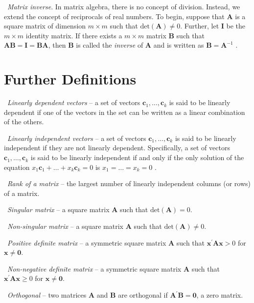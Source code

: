 \textbullet\ \emph{Matrix inverse}. In matrix algebra, there is no
concept of division. Instead, we extend the concept of reciprocals
of real numbers. To begin, suppose that $\mathbf{A}$ is a square
matrix of dimension $m\times m$ such that
$\mathrm{det}(\mathbf{A})\neq 0$. Further, let $\mathbf{I}$ be the
$m\times m$ identity matrix. If there exists a $m\times m$ matrix $
\mathbf{B}$ such that $\mathbf{AB=I=BA}$, then $\mathbf{B}$ is
called the \emph{inverse} of $\mathbf{A}$ and is written as
$\mathbf{B}=\mathbf{A}^{-1}$ .

\section{Further Definitions}

\quad \quad \textbullet\ \emph{Linearly dependent vectors} -- a set of
vectors $\mathbf{c}_{1},\ldots ,\mathbf{c}_{k}$ is said to be linearly
dependent if one of the vectors in the set can be written as a linear
combination of the others.

\textbullet\ \emph{Linearly independent vectors} -- a set of vectors
$ \mathbf{c}_{1},\ldots ,\mathbf{c}_{k}$ is said to be linearly
independent if they are not linearly dependent. Specifically, a set
of vectors $\mathbf{c} _{1},\ldots ,\mathbf{c}_{k}$ is said to be
linearly independent if and only if the only solution of the
equation $x_{1}\mathbf{c}_{1}+\ldots +x_{k} \mathbf{c}_{k}=0$ is
$x_{1}\mathbf{=}\ldots =x_{k}=0$ .

\textbullet\ \emph{Rank of a matrix} -- the largest number of linearly
independent columns (or rows) of a matrix.

\textbullet\ \emph{Singular matrix} -- a square matrix $\mathbf{A}$ such
that $\mathrm{det}(\mathbf{A})=0$.

\textbullet \emph{\ Non-singular matrix }-- a square matrix
$\mathbf{A}$ such that $\mathrm{det}(\mathbf{A})\neq 0$.

\textbullet\ \emph{Positive definite matrix} -- a symmetric square
matrix $ \mathbf{A}$ such that $\mathbf{x}^{\prime}\mathbf{Ax>}0$
for $\mathbf{x\neq 0}$.

\textbullet\ \emph{Non-negative definite matrix} -- a symmetric
square matrix $\mathbf{A}$ such that
$\mathbf{x}^{\prime}\mathbf{Ax\geq }0$ for $ \mathbf{x\neq 0}$.

\textbullet\ \emph{Orthogonal} -- two matrices $\mathbf{A}$ and
$\mathbf{B}$ are orthogonal if $\mathbf{A}^{\prime}\mathbf{B=0}$, a
zero matrix.

